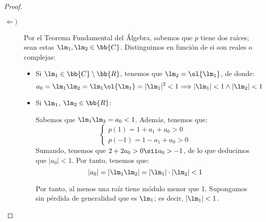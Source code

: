 \begin{lema}
\begin{proof}
\begin{description}
        \item[$\Longleftarrow)$] Por el Teorema Fundamental del Álgebra, sabemos que $p$ tiene dos raíces; sean estas $\lm_1,\lm_2\in \bb{C}$. Distinguimos en función de si son reales o complejas:
        \begin{itemize}
            \item Si $\lm_1 \in \bb{C}\setminus\bb{R}$, tenemos que $\lm_2 = \ol{\lm_1}$, de donde:
            \begin{equation*}
                a_0 = \lm_1\lm_2 = \lm_1\ol{\lm_1} = |\lm_1|^2 < 1 \Longrightarrow |\lm_1|< 1 \land |\lm_2| < 1
            \end{equation*}
            \item Si $\lm_1$, $\lm_2 \in \bb{R}$:

            Sabemos que $\lm_1\lm_2 = a_0 < 1$. Además, tenemos que:
            \begin{equation*}
                \left\{\begin{array}{l}
                    p(1) = 1 + a_1 + a_0 > 0 \\
                    p(-1) = 1 - a_1 + a_0 > 0
                \end{array}\right.
            \end{equation*}
            Sumando, tenemos que $2+2a_0>0\sii a_0>-1$, de lo que deducimos que $|a_0|<1$. Por tanto, tenemos que:
            \begin{equation*}
                |a_0| = |\lm_1\lm_2| = |\lm_1|\cdot |\lm_2|<1
            \end{equation*}

            Por tanto, al menos una raíz tiene módulo menor que 1. Supongamos sin pérdida de generalidad que es $\lm_1$; es decir, $|\lm_1| < 1$.
            \begin{figure}[H]
                \centering
            \end{figure}


\end{itemize}
\end{description}
\end{proof}
\end{lema}
